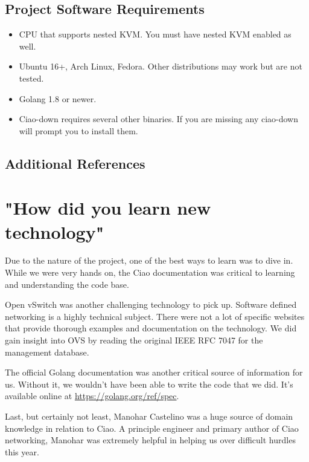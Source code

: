 \documentclass[10pt,onecolumn,journal,draftclsnofoot]{IEEEtran}
\begin{document}
\subsection{Project Software Requirements}
\begin{itemize}
    \item CPU that supports nested KVM. You must have nested KVM enabled as well.
    \item Ubuntu 16+, Arch Linux, Fedora. Other distributions may work but are not tested.
    \item Golang 1.8 or newer.
    \item Ciao-down requires several other binaries. If you are missing any ciao-down will prompt you to install them.
\end{itemize}
\subsection{Additional References}

\section{"How did you learn new technology"}
Due to the nature of the project, one of the best ways to learn was to dive in. While we were very hands on, the Ciao documentation was critical to learning and understanding the code base. 

Open vSwitch was another challenging technology to pick up. Software defined networking is a highly technical subject. There were not a lot of specific websites that provide thorough examples and documentation on the technology. We did gain insight into OVS by reading the original IEEE RFC 7047 for the management database\cite{rfc7047}.

The official Golang documentation was another critical source of information for us. Without it, we wouldn't have been able to write the code that we did. It's available online at \url{https://golang.org/ref/spec}.

Last, but certainly not least, Manohar Castelino was a huge source of domain knowledge in relation to Ciao. A principle engineer and primary author of Ciao networking, Manohar was extremely helpful in helping us over difficult hurdles this year.

\end{document}
